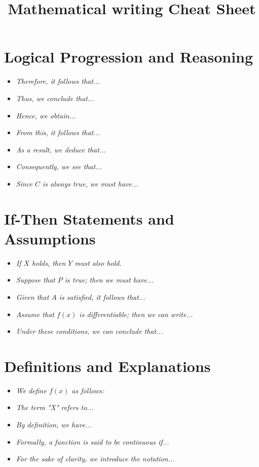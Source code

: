 \documentclass[10pt,letterpaper,oneside,reqno]{amsart}
\title[Mathematical writing Cheat Sheet]
{Mathematical writing Cheat Sheet}
\begin{document}
    \maketitle

    \begin{multicols}{2}
        \section*{Logical Progression and Reasoning}
        \begin{itemize}
            \item \textit{Therefore, it follows that...}
            \item \textit{Thus, we conclude that...}
            \item \textit{Hence, we obtain...}
            \item \textit{From this, it follows that...}
            \item \textit{As a result, we deduce that...}
            \item \textit{Consequently, we see that...}
            \item \textit{Since $C$ is always true, we must have...}
        \end{itemize}


        \section*{If-Then Statements and Assumptions}
        \begin{itemize}
            \item \textit{If \( X \) holds, then \( Y \) must also hold.}
            \item \textit{Suppose that \( P \) is true; then we must have...}
            \item \textit{Given that \( A \) is satisfied, it follows that...}
            \item \textit{Assume that \( f(x) \) is differentiable; then we can write...}
            \item \textit{Under these conditions, we can conclude that...}
        \end{itemize}


        \section*{Definitions and Explanations}
        \begin{itemize}
            \item \textit{We define \( f(x) \) as follows:}
            \item \textit{The term "X" refers to...}
            \item \textit{By definition, we have...}
            \item \textit{Formally, a function is said to be continuous if...}
            \item \textit{For the sake of clarity, we introduce the notation...}
        \end{itemize}



\end{multicols}
\end{document}
